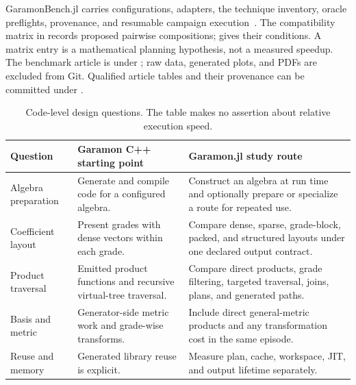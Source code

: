 \documentclass[11pt,a4paper]{article}
\begin{document}
GaramonBench.jl carries configurations, adapters, the technique
inventory, oracle preflights, provenance, and resumable campaign
execution~\cite{garamonbench,drwatson}. The compatibility matrix in
 records proposed pairwise
compositions;  gives their conditions.
A matrix entry is a mathematical planning hypothesis, not a measured
speedup. The benchmark article is under ; raw data,
generated plots, and PDFs are excluded from Git. Qualified article
tables and their provenance can be committed under
.

\begin{table}[tbp]
\centering\small
\begin{tabularx}{\linewidth}{@{}p{27mm}XX@{}}
\toprule
Question & Garamon C++ starting point & Garamon.jl study route\\
\midrule
Algebra preparation &
Generate and compile code for a configured algebra. &
Construct an algebra at run time and optionally prepare or specialize
a route for repeated use.\\
Coefficient layout &
Present grades with dense vectors within each grade. &
Compare dense, sparse, grade-block, packed, and structured layouts
under one declared output contract.\\
Product traversal &
Emitted product functions and recursive virtual-tree traversal. &
Compare direct products, grade filtering, targeted traversal, joins,
plans, and generated paths.\\
Basis and metric &
Generator-side metric work and grade-wise transforms. &
Include direct general-metric products and any transformation cost in
the same episode.\\
Reuse and memory &
Generated library reuse is explicit. &
Measure plan, cache, workspace, JIT, and output lifetime separately.\\
\bottomrule
\end{tabularx}
\caption{Code-level design questions. The table makes no assertion about
relative execution speed.}
\label{tab:design}
\end{table}
\end{document}
